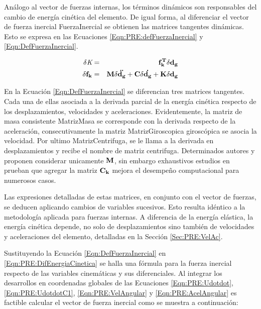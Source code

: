 Análogo al vector de fuerzas internas, los términos dinámicos son responsables del cambio de energía cinética del elemento. De igual forma, al diferenciar el vector de fuerza inercial \gls{FuerzaInercial} se obtienen las matrices tangentes dinámicas. Esto se expresa en las Ecuaciones \eqref{Eqn:PRE:defFuerzaInercial} y \eqref{Eqn:DefFuerzaInercial}.

\begin{eqnarray}
		\label{Eqn:PRE:defFuerzaInercial}
	\delta\textit{K}&=&\bf{f_k^T}\delta\bf{d}_g\\
	\label{Eqn:DefFuerzaInercial}
	\delta\bf{f_k}&=& \bf{M}\delta \ddot{\bf{d_g}}+\bf{C}\delta
	\dot{\bf{d_g}}+\bf{K}\delta{\bf{d_g}}
\end{eqnarray}


En la Ecuación \ref{Eqn:DefFuerzaInercial} se diferencian tres matrices tangentes. Cada una de ellas asociada a la derivada parcial de la energía cinética respecto de los desplazamientos, velocidades y aceleraciones. Evidentemente, la matriz de masa consistente \gls{MatrizMasa} se corresponde con la derivada respecto de la aceleración, consecutivamente la matriz \gls{MatrizGiroscopica} giroscópica se asocia la velocidad. Por ultimo \gls{MatrizCentrifuga}, se le llama a la derivada en desplazamientos y recibe el nombre de matriz centrifuga. Determinados autores \cite{cardona1988beam} y \cite{hsiao1999consistent} proponen considerar unicamente $\bf{M}$, sin embargo exhaustivos estudios en \citep{hsiao1999consistent} prueban que agregar la matriz $\bf{C_k}$ mejora el desempeño computacional para numerosos casos.

Las expresiones detalladas de estas matrices, en conjunto con el vector de fuerzas, se deducen aplicando cambios de variables sucesivos. Esto resulta idéntico a la metodología aplicada para fuerzas internas. A diferencia de la energía elástica, la energía cinética depende, no solo de desplazamientos sino también de velocidades y aceleraciones del elemento, detalladas en la Sección \ref{Sec:PRE:VelAc}.

Sustituyendo la Ecuación \eqref{Eqn:DefFuerzaInercial} en \eqref{Eqn:PRE:DifEnergiaCinetica} se halla una fórmula para la fuerza inercial respecto de las variables cinemáticas y sus diferenciales. Al integrar los desarrollos en coordenadas globales de las Ecuaciones \eqref{Eqn:PRE:Udotdot}, \eqref{Eqn:PRE:UdotdotC1}, \eqref{Eqn:PRE:VelAngular} y \eqref{Eqn:PRE:AcelAngular}  es factible calcular el vector de fuerza inercial como se muestra a continuación:

